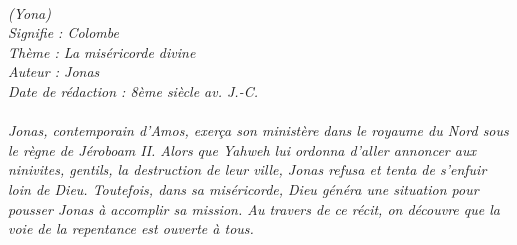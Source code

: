 \BFont
\noindent\hrulefill
{\footnotesize
\textit{
\bigskip
{\centering{}
\\(Yona)
\\Signifie : Colombe
\\Thème : La miséricorde divine
\\Auteur : Jonas
\\Date de rédaction : 8ème siècle av. J.-C.\\}
}
\textit{
\\Jonas, contemporain d’Amos, exerça son ministère dans le royaume du Nord sous le règne de Jéroboam II. Alors que Yahweh lui ordonna d’aller annoncer aux ninivites, gentils, la destruction de leur ville, Jonas refusa et tenta de s’enfuir loin de Dieu. Toutefois, dans sa miséricorde, Dieu généra une situation pour pousser Jonas à accomplir sa mission. Au travers de ce récit, on découvre que la voie de la repentance est ouverte à tous.\bigskip
}
}
\par\nobreak\noindent\hrulefill
